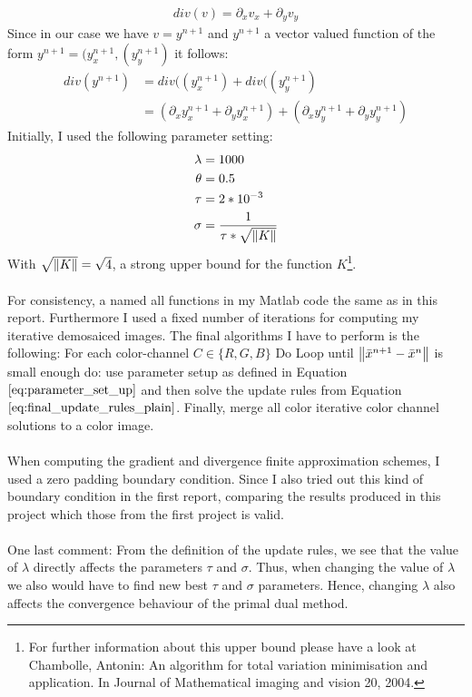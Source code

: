 \begin{align}
	div(v) = \partial_x v_x + \partial_y v_y
\end{align}
Since in our case we have $v = y^{n+1}$ and $y^{n+1}$ a vector valued function of the form $y^{n+1} = (y_{x}^{n+1}, (y_{y}^{n+1})$ it follows:
\begin{align}
	div(y^{n+1}) 
	&= div((y_{x}^{n+1}) + div((y_{y}^{n+1}) \\
	&= \left( \partial_x y_{x}^{n+1} + \partial_y y_{x}^{n+1} \right) + \left( \partial_x y_{y}^{n+1} + \partial_y y_{y}^{n+1} \right)
\end{align}
Initially, I used the following parameter setting:
\begin{align}
	\lambda &= 1000 \\
	\theta &= 0.5 \\
	\tau &= 2*10^{-3} \\
	\sigma &= \frac{1}{\tau * \sqrt{\left\lVert K\right\rVert}}
\label{eq:parameter_set_up}	
\end{align}
With $\sqrt{\left\lVert K\right\rVert} = \sqrt{4}$, a strong upper bound for the function $K$\footnote{For further information about this upper bound please have a look at Chambolle, Antonin: An algorithm for total variation minimisation and application. In Journal of Mathematical imaging and vision 20, 2004.}. \\ \\
For consistency, a named all functions in my Matlab code the same as in this report. Furthermore I used a fixed number of iterations for computing my iterative demosaiced images. The final algorithms I have to perform is the following: For each color-channel $C \in \{R,G,B\}$ Do Loop until $\left\lVert\bar{x}^{n+1} - \bar{x}^{n}\right\rVert$ is small enough do: use parameter setup as defined in Equation $\ref{eq:parameter_set_up}$ and then solve the update rules from Equation $\ref{eq:final_update_rules_plain}$. Finally, merge all color iterative color channel solutions to a color image. \\ \\
When computing the gradient and divergence finite approximation schemes, I used a zero padding boundary condition. Since I also tried out this kind of boundary condition in the first report, comparing the results produced in this project which those from the first project is valid. \\ \\
One last comment: From the definition of the update rules, we see that the value of $\lambda$ directly affects the parameters $\tau$ and $\sigma$. Thus, when changing the value of $\lambda$ we also would have to find new best $\tau$ and $\sigma$ parameters. Hence, changing $\lambda$ also affects the convergence behaviour of the primal dual method. 
